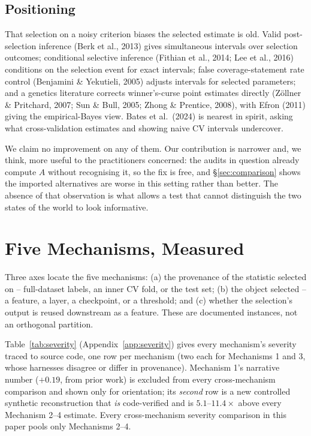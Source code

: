 \documentclass{article}
\begin{document}
\subsection{Positioning}
\label{sec:relation}

That selection on a noisy criterion biases the selected estimate is old.
Valid post-selection inference (Berk et al., 2013) gives simultaneous
intervals over selection outcomes; conditional selective inference
(Fithian et al., 2014; Lee et al., 2016) conditions on the selection event for
exact intervals; false coverage-statement rate control (Benjamini \&
Yekutieli, 2005) adjusts intervals for selected parameters; and a genetics
literature corrects winner's-curse point estimates directly
(Z\"ollner \& Pritchard, 2007; Sun \& Bull, 2005; Zhong \& Prentice, 2008),
with Efron (2011) giving the empirical-Bayes view. Bates et al.\ (2024) is
nearest in spirit, asking what cross-validation estimates and showing naive CV
intervals undercover.

We claim no improvement on any of them. Our contribution is narrower and, we
think, more useful to the practitioners concerned: the audits in question
already compute $A$ without recognising it, so the fix is free, and
\S\ref{sec:comparison} shows the imported alternatives are worse in this
setting rather than better. The absence of that observation is what allows a
test that cannot distinguish the two states of the world to look
informative.

\section{Five Mechanisms, Measured}
\label{sec:mechanisms}

Three axes locate the five mechanisms: (a) the provenance of the statistic
selected on -- full-dataset labels, an inner CV fold, or the test set; (b)
the object selected -- a feature, a layer, a checkpoint, or a threshold; and
(c) whether the selection's output is reused downstream as a feature. These
are documented instances, not an orthogonal partition.


Table~\ref{tab:severity} (Appendix~\ref{app:severity}) gives every
mechanism's severity traced to source code, one row per mechanism (two each for Mechanisms 1 and 3, whose harnesses disagree
or differ in provenance). Mechanism 1's narrative number ($+0.19$, from prior
work) is excluded from every cross-mechanism comparison and shown only for
orientation; its \emph{second} row is a new controlled synthetic
reconstruction that \emph{is} code-verified and is $5.1$--$11.4\times$
above every Mechanism 2--4 estimate. Every cross-mechanism severity comparison in this
paper pools only Mechanisms 2--4.
\end{document}
